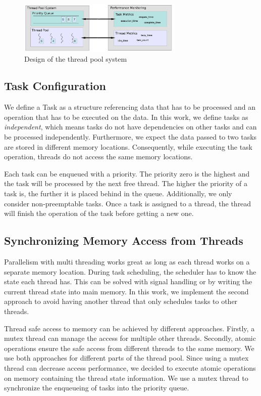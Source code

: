 \documentclass[conference]{IEEEtran}
\begin{document}
\begin{figure}[htbp]
	\centering \includegraphics[width=0.7\textwidth]{img/pool_structure.png}
	\caption{Design of the thread pool system}
	\label{fig0}
\end{figure}

\subsection{Task Configuration}
We define a Task as a structure referencing data that has to be processed and an operation that has to be executed on the data. In this work, we define tasks as \emph{independent}, which means tasks do not have dependencies on other tasks and can be processed independently. Furthermore, we expect the data passed to two tasks are stored in different memory locations. Consequently, while executing the task operation, threads do not access the same memory locations.

Each task can be enqueued with a priority. The priority zero is the highest and the task will be processed by the next free thread. The higher the priority of a task is, the further it is placed behind in the queue. Additionally, we only consider non-preemptable tasks. Once a task is assigned to a thread, the thread will finish the operation of the task before getting a new one.

\subsection{Synchronizing Memory Access from Threads}
Parallelism with multi threading works great as long as each thread works on a separate memory location. During task scheduling, the scheduler has to know the state each thread has. This can be solved with signal handling or by writing the current thread state into main memory. In this work, we implement the second approach to avoid having another thread that only schedules tasks to other threads.

Thread safe access to memory can be achieved by different approaches. Firstly, a mutex thread can manage the access for multiple other threads. Secondly, atomic operations ensure the safe access from different threads to the same memory. We use both approaches for different parts of the thread pool. Since using a mutex thread can decrease access performance, we decided to execute atomic operations on memory containing the thread state information. We use a mutex thread to synchronize the enqueueing of tasks into the priority queue.
\end{document}
